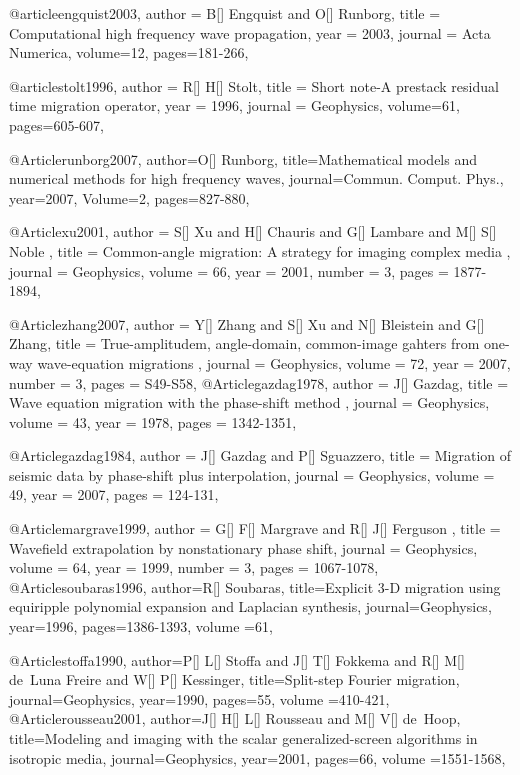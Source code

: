 @article{engquist2003,
  author =	 {B[] Engquist and O[] Runborg},
  title =	 {Computational high frequency wave propagation},
  year =	 2003,
  journal =	 {Acta Numerica},
  volume={12},
 pages=181-266,
}

@article{stolt1996,
  author =	 {R[] H[] Stolt},
  title =	 {Short note-A prestack residual time migration operator},
  year =	 1996,
  journal =	 {Geophysics},
  volume={61},
 pages=605-607,
}

@Article{runborg2007,
  author={O[] Runborg},
  title={Mathematical models and numerical methods for high frequency waves},
  journal={Commun. Comput. Phys.},
  year=2007,
  Volume=2,
  pages={827-880},
}

@Article{xu2001,
  author =	 { S[] Xu and H[] Chauris and G[] Lambare and M[] S[] Noble },
  title =	 { Common-angle migration: A strategy for imaging complex media },
  journal =	 {Geophysics},
  volume =	 66,
  year =	 2001,
  number =	 3,
  pages =	 {1877-1894},
}

@Article{zhang2007,
  author =	 { Y[] Zhang and S[] Xu and N[] Bleistein and G[] Zhang},
  title =	 { True-amplitudem, angle-domain, common-image gahters from one-way wave-equation migrations },
  journal =	 {Geophysics},
  volume =	 72,
  year =	 2007,
  number =	 3,
  pages =	 {S49-S58},
}
@Article{gazdag1978,
  author =	 { J[] Gazdag},
  title =	 { Wave equation migration with the phase-shift method },
  journal =	 {Geophysics},
  volume =	 43,
  year =	 1978,
  pages =	 {1342-1351},
}

@Article{gazdag1984,
  author =	 { J[] Gazdag and P[] Sguazzero},
  title =	 { Migration of seismic data by phase-shift plus interpolation},
  journal =	 {Geophysics},
  volume =	 49,
  year =	 2007,
  pages =	 {124-131},
}

@Article{margrave1999,
  author =	 { G[] F[] Margrave and R[] J[] Ferguson },
  title =	 { Wavefield extrapolation by nonstationary phase shift},
  journal =	 {Geophysics},
  volume =	 64,
  year =	 1999,
  number =	 3,
  pages =	 {1067-1078},
}
@Article{soubaras1996,
author={R[] Soubaras},
title={Explicit 3-D migration using equiripple polynomial expansion and Laplacian synthesis},
journal={Geophysics},
year=1996,
pages={1386-1393},
volume ={61},
}

@Article{stoffa1990,
author={P[] L[] Stoffa and J[] T[] Fokkema and R[] M[] de~Luna Freire and W[] P[] Kessinger},
title={Split-step {F}ourier migration},
journal={Geophysics},
year=1990,
pages={55},
volume ={410-421},
}
@Article{rousseau2001,
author={J[] H[] L[] Rousseau and M[] V[] de~Hoop},
title={Modeling and imaging with the scalar generalized-screen algorithms in isotropic media},
journal={Geophysics},
year=2001,
pages={66},
volume ={1551-1568},
}

